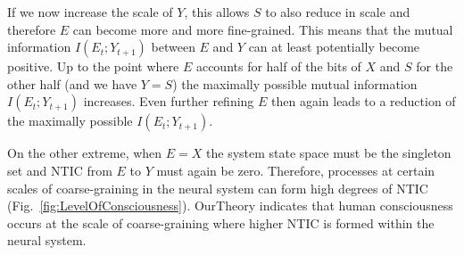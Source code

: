 \documentclass[utf8]{article}
\begin{document}
    		If we now increase the scale of $Y$, this allows $S$ to also reduce in scale and therefore $E$ can become more and more fine-grained. This means that the mutual information $I(E_t;Y_{t+1})$ between $E$ and $Y$ can at least potentially become positive. Up to the point where $E$ accounts for half of the bits of $X$ and $S$ for the other half (and we have $Y=S$) the maximally possible mutual information $I(E_t;Y_{t+1})$ increases. Even further refining $E$ then again leads to a reduction of the maximally possible $I(E_t;Y_{t+1})$.  
    		
    		
    		
    		On the other extreme, when $E=X$ the system state space must be the singleton set and NTIC from $E$ to $Y$ must again be zero. Therefore, processes at certain scales of coarse-graining in the neural system can form high degrees of NTIC (Fig.~\ref{fig:LevelOfConsciousness}). \ac{OurTheory} indicates that human consciousness occurs at the scale of coarse-graining where higher NTIC is formed within the neural system. 
    		
\end{document}
